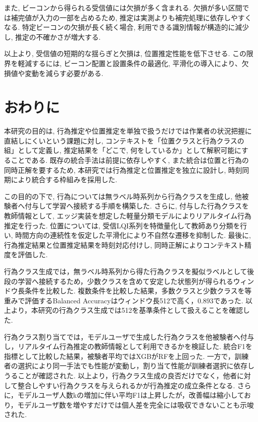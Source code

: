 \documentclass[a4paper,12pt]{jreport}
\begin{document}
また, ビーコンから得られる受信値には欠損が多く含まれる. 欠損が多い区間では補完値が入力の一部を占めるため, 推定は実測よりも補完処理に依存しやすくなる. 特定ビーコンの欠損が長く続く場合, 利用できる識別情報が構造的に減少し, 推定の不確かさが増大する. 

以上より, 受信値の短期的な揺らぎと欠損は, 位置推定性能を低下させる. この限界を軽減するには, ビーコン配置と設置条件の最適化, 平滑化の導入により、欠損値や変動を減らす必要がある. 



\chapter{おわりに}
本研究の目的は, 行為推定や位置推定を単独で扱うだけでは作業者の状況把握に直結しにくいという課題に対し, コンテキストを「位置クラスと行為クラスの組」として定義し, 推定結果を「どこで, 何をしているか」として解釈可能にすることである. 既存の統合手法は前提に依存しやすく, また統合は位置と行為の同時正解を要するため, 本研究では行為推定と位置推定を独立に設計し, 時刻同期により統合する枠組みを採用した. 

この目的の下で, 行為については無ラベル時系列から行為クラスを生成し, 他被験者へ付与して学習へ接続する手順を構築した. さらに, 付与した行為クラスを教師情報として, エッジ実装を想定した軽量分類モデルによりリアルタイム行為推定を行った. 位置については, 受信LQI系列を特徴量化して教師あり分類を行い, 時間方向の連続性を仮定した平滑化により不自然な遷移を抑制した. 最後に, 行為推定結果と位置推定結果を時刻対応付けし, 同時正解によりコンテキスト精度を評価した. 

行為クラス生成では，無ラベル時系列から得た行為クラスを擬似ラベルとして後段の学習へ接続するため，少数クラスを含めて安定した状態列が得られるウィンドウ長条件を比較した. 複数条件を比較した結果，多数クラスと少数クラスを等重みで評価するBalanced Accuracyはウィンドウ長512で高く，0.893であった. 以上より，本研究の行為クラス生成では512を基準条件として扱えることを確認した. 

行為クラス割り当てでは，モデルユーザで生成した行為クラスを他被験者へ付与し，リアルタイム行為推定の教師情報として利用できるかを検証した. 統合F1を指標として比較した結果，被験者平均ではXGBがRFを上回った. 一方で，訓練者の選択により同一手法でも性能が変動し，割り当て性能が訓練者選択に依存しうることが確認された. 以上より，行為クラス生成の良否だけでなく，他者に対して整合しやすい行為クラスを与えられるかが行為推定の成立条件となる. さらに，モデルユーザ人数kの増加に伴い平均F1は上昇したが，改善幅は縮小しており，モデルユーザ数を増やすだけでは個人差を完全には吸収できないことも示唆された. 
\end{document}

